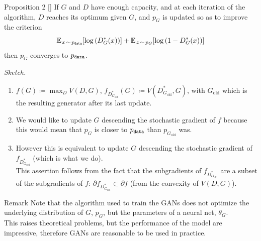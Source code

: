 \documentclass{beamer}
\begin{document}
	\begin{frame}
		\begin{block}{Proposition 2 \hfill [\citeauthor{goodfellow2014}]}
			If $G$ and $D$ have enough capacity, and at each iteration of the algorithm, $D$ reaches its optimum given $G$, and $p_G$ is updated so as to improve the criterion
			\vspace{-0.3cm}
			\begin{equation*}
				\mean[x \sim p_\text{\texttt{data}}]{\log{D^*_G(x)}} + \mean[z \sim p_G]{\log{1 - D^*_G(x)}}
			\end{equation*}
			\vskip -0.3cm
			then $p_G$ converges to $p_\text{\texttt{data}}$.
		\end{block}
		\textit{Sketch.} 
		\begin{enumerate}
			\item $f(G) \coloneqq \max_D V(D, G)$, $f_{D^*_{G_\text{old}}}(G) \coloneqq V(D^*_{G_\text{old}}, G)$, with $G_\text{old}$ which is the resulting generator after its last update.
			\item We would like to update $G$ descending the stochastic gradient of $f$ because this would mean that $p_G$ is closer to $p_\text{\texttt{data}}$ than $p_{G_\text{old}}$ was.
		\end{enumerate}
	\end{frame}
	
	\begin{frame}
		\begin{enumerate}\setcounter{enumi}{2}
			\item However this is equivalent to update $G$ descending the stochastic gradient of $f_{D^*_{G_\text{old}}}$ (which is what we do). \\
			This assertion follows from the fact that the subgradients of $f_{D^*_{G_\text{old}}}$ are a subset of the subgradients of $f$: $\partial f_{D^*_{G_\text{old}}} \subset \partial f$ (from the convexity of $V(D, G)$).
		\end{enumerate}
		\begin{block}{Remark}
			Note that the algorithm used to train the GANs does not optimize the underlying distribution of $G$, $p_G$, but the parameters of a neural net, $\theta_G$. \\
			\medskip
			This raises theoretical problems, but the performance of the model are impressive, therefore GANs are reasonable to be used in practice.
		\end{block}
	\end{frame}
\end{document}
